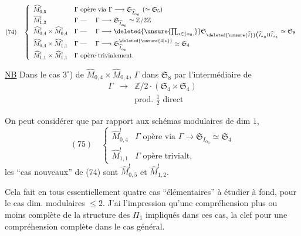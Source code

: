 \[
(74)\quad\left\{\begin{array}{ll}
\widehat M^!_{0,5}&\Gamma\text{ opère via }\Gamma\longrightarrow\mathfrak S_{\widehat I_{\alpha_0}}\ (\simeq\mathfrak S_5)\\
\widehat M^!_{1,2}&\Gamma\text{ --- }\quad\Gamma\longrightarrow\mathfrak S_{\widehat I_{\alpha_0}}\simeq\mathbb Z/2\mathbb Z\\
\widehat M^!_{0,4}\times\widehat M^!_{0,4}&\Gamma\text{ --- }\quad\Gamma\longrightarrow\deleted{\unsure{\prod_{\alpha\in\{\alpha_0,}}}\mathfrak S_{\deleted{\unsure{\widehat I}}\bigl(\widehat I_{\alpha_0}\amalg\widehat I_{\alpha_1}}\simeq\mathfrak S_8\\
\widehat M^!_{0,4}\times\widehat M^!_{1,1}&\Gamma\text{ --- }\quad\Gamma\longrightarrow\mathfrak S^{\deleted{\unsure{4|*}}}_{\widehat I_{\alpha_0}}\simeq\mathfrak S_4\\
\widehat M^!_{1,1}\times\widehat M^!_{1,1}&\Gamma\text{ opère trivialement.}
\end{array}\right.
\]

\uline{NB}  Dans le cas $3^\circ$) de $\widehat M_{0,4}\times\widehat M_{0,4}$, $\Gamma$  dans $\mathfrak S_8$ par l'intermédiaire de
\[
\begin{array}{rcl}
\Gamma&\longrightarrow&\mathbb Z/2\mathbin{\cdot}(\mathfrak S_4\times\mathfrak S_4)\\
&&\text{prod. }\frac12\text{ direct}
\end{array}
\]

On peut considérer que par rapport aux schémas modulaires  de dim $1$, 
\[
(75)\quad\left\{\begin{array}{ll}
\widehat M^!_{0,4}&\Gamma\text{ opère via }\Gamma\longrightarrow\mathfrak S_{I_{\alpha_0}}\simeq\mathfrak S_4\\
\widehat M^!_{1,1}&\Gamma\text{ opère trivialt},
\end{array}\right.
\]
les ``cas nouveaux'' de (74) sont $\widehat M^!_{0,5}$ et $\widehat M^!_{1,2}$.

Cela fait en tous essentiellement quatre cas ``élémentaires'' à étudier à fond, pour le cas  dim. modulaires $\leq2$. J'ai l'impression qu'une compréhension plus ou moins complète de la structure des $\Pi_1$  impliqués dans ces cas,  la clef pour une compréhension complète dans le cas général.
